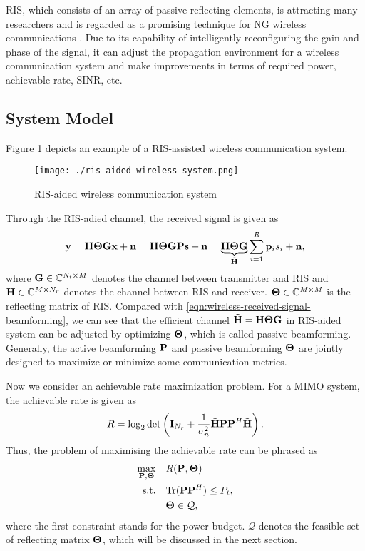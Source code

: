 RIS, which consists of an array of passive reflecting elements, is attracting many researchers and 
is regarded as a promising technique for NG wireless communications \cite{liu2020RIS}. Due to its capability of intelligently 
reconfiguring the gain and phase of the signal, it can adjust the propagation environment for a wireless communication system
and make improvements in terms of required power, achievable rate, SINR, etc.

\subsection{System Model}

Figure \ref{fig:ris-aided-wireless-system} depicts an example of a RIS-assisted wireless communication system.

\begin{figure}[htbp]
    \centering
    \texttt{[image: ./ris-aided-wireless-system.png]}
    \caption{RIS-aided wireless communication system}
    \label{fig:ris-aided-wireless-system}
\end{figure}

Through the RIS-adied channel, the received signal is given as
\begin{equation} \label{eqn:ris-signal-model}
    {\bf y} = {\bf H\Theta Gx + n} = {\bf H\Theta GPs +n} = \underbrace{\bf H\Theta G}_{{\bf \tilde{\bf H}}}\sum_{i=1}^R {\bf p}_i s_i + {\bf n},
\end{equation}
where ${\bf G} \in \mathbb{C}^{N_t \times M}$ denotes the channel between transmitter and RIS 
and ${\bf H} \in \mathbb{C}^{M \times N_r}$ denotes the channel between RIS and receiver.
${\bf \Theta} \in \mathbb{C}^{M \times M}$ is the reflecting matrix of RIS.
Compared with \eqref{eqn:wireless-received-signal-beamforming}, we can see that the efficient channel $\tilde{\bf H} = {\bf H\Theta G}$ 
in RIS-aided system can be adjusted by optimizing ${\bf \Theta}$, which is called passive beamforming. Generally, the 
active beamforming ${\bf P}$ and passive beamforming ${\bf \Theta}$ are jointly designed to maximize or minimize some 
communication metrics.

Now we consider an achievable rate maximization problem. For a MIMO system, the achievable rate is given as
\begin{equation}
    R = \log_2 \det \left( {\bf I}_{N_r} + \frac{1}{\sigma_n^2} \tilde{\bf H} {\bf P}{\bf P}^H \tilde{\bf H} \right).
\end{equation}
Thus, the problem of maximising the achievable rate can be phrased as
\begin{subequations} \label{problem:ris-rate-example}
    \begin{align}
      \max_{{\bf P, \Theta}} \quad &R({\bf P, \Theta}) \\
      \mathrm{s.t.} \quad & \mathrm{Tr}({\bf PP}^H) \leq P_t, \\ 
      & {\bf \Theta} \in \mathcal{Q},
    \end{align}
\end{subequations}
where the first constraint stands for the power budget. $\mathcal{Q}$ denotes the feasible set of reflecting matrix ${\bf \Theta}$,
which will be discussed in the next section.

